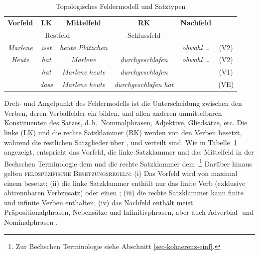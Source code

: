 \begin{table}[t]
\centering
\begin{tabular}{c|c|c|c|cc}
{\bf Vorfeld} & {\bf LK} & {\bf Mittelfeld} & {\bf RK} & {\bf Nachfeld} \\
\cline{1-5}
\multicolumn{3}{c|}{Restfeld} & Schlussfeld \\
\cline{1-5}
\cline{1-5}
{\it Marlene} & {\it isst} & {\it heute Plätzchen} & & {\it obwohl \ldots} & (V2) \\
{\it Heute} & {\it hat} & {\it Marlene} & {\it durchgeschlafen} & {\it obwohl \ldots} & (V2) \\
& {\it hat} & {\it Marlene} {\it heute} & {\it durchgeschlafen} & & (V1) \\
 & {\it dass} & {\it Marlene} {\it heute} & {\it durchgeschlafen} {\it hat} & & (VE)
\end{tabular}
\caption{\label{ex-feldermodell}Topologisches Feldermodell und Satztypen}
\end{table}

Dreh- und Angelpunkt des Feldermodells ist die Unterscheidung zwischen den Verben, deren Verbalfelder ein  bilden, und allen anderen unmittelbaren Konstituenten des Satzes, d.\,h.\ Nominalphrasen, Adjektive, Gliedsätze, etc. Die linke  (LK) und die rechte Satzklammer (RK) werden von den Verben besetzt, während die restlichen Satzglieder über ,  und  verteilt sind. Wie in Tabelle~\ref{ex-feldermodell} angezeigt, entspricht das Vorfeld, die linke Satzklammer und das Mittelfeld in der Bechschen Terminologie dem  und die rechte Satzklammer dem .\footnote{Zur Bechschen Terminologie siehe Abschnitt \ref{sec-kohaerenz-einf}.} Darüber hinaus gelten \textsc{feldspezifische Besetzungsregeln}: (i) Das Vorfeld wird von maximal einem  besetzt; (ii) die linke Satzklammer enthält nur das finite Verb (exklusive abtrennbaren Verbzusatz) oder einen ; (iii) die rechte Satzklammer kann finite und infinite Verben enthalten; (iv) das Nachfeld enthält meist Präpositionalphrasen, Nebensätze und Infinitivphrasen, aber auch Adverbial- und Nominalphrasen \citep[Kapitel~13]{Mueller:99}.

